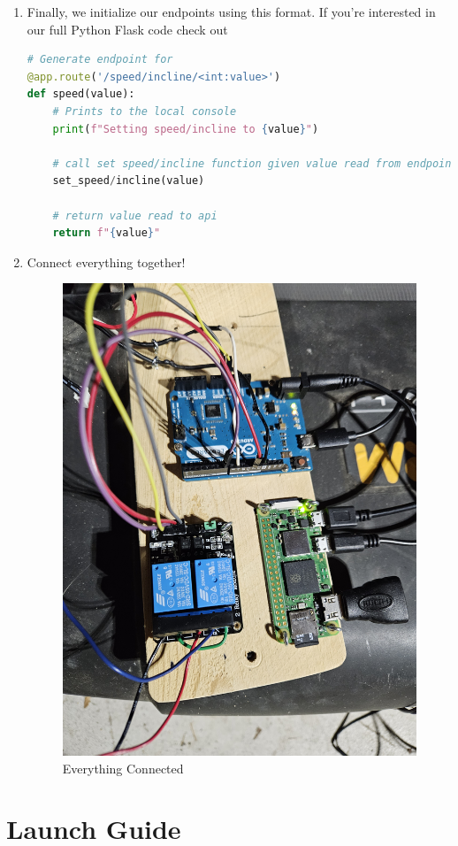 \documentclass[journal]{IEEEtran}
\newcommand{\MYhref}[3][blue]{\href{#2}{\color{#1}{#3}}}%
\begin{document}
\begin{enumerate}
\begin{lstlisting}[language=Python]
# Path for all the static files (compiled JS/CSS, etc.)
@app.route("/<path:path>")
def home(path):
    return send_from_directory('my-app/build', path)
\end{lstlisting}

\item Finally, we initialize our endpoints using this format. If you're interested in our full Python Flask code check out \MYhref{https://github.com/Leo-Berman/Treadmill-To-Walking-Pad/blob/945cfb8c59715d0fab2927238e48ba3bab0aa0fc/site/webserver.py}{this portion of our GitHub}
\begin{lstlisting}[language=Python]
# Generate endpoint for 
@app.route('/speed/incline/<int:value>')
def speed(value):
    # Prints to the local console 
    print(f"Setting speed/incline to {value}")
    
    # call set speed/incline function given value read from endpoint
    set_speed/incline(value)
    
    # return value read to api
    return f"{value}"
\end{lstlisting}

\item Connect everything together!
    \begin{figure}[H]
            \centering
            \includegraphics[width=0.5\linewidth]{Everything_Wired.jpg}
            \caption{Everything Connected}
            \label{fig:8}
    \end{figure}
\end{enumerate}

\section{Launch Guide}
\end{document}
